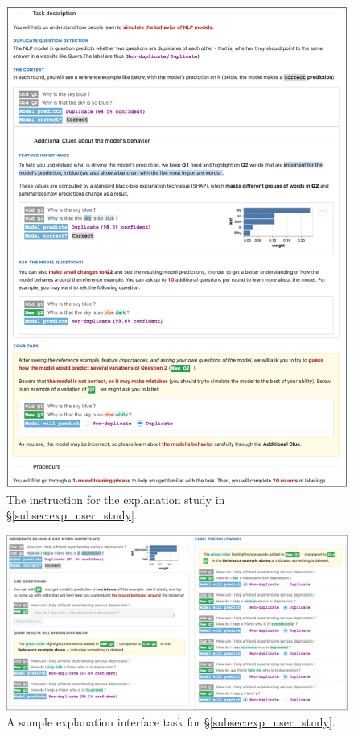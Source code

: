 \begin{figure}
\centering
\includegraphics[width=1\textwidth]{figures/explanation_instruction}
\vspace{-15pt}
\caption{The instruction for the explanation study in \S\ref{subsec:exp_user_study}.}
\vspace{-10pt}
\label{fig:explanation_instruction}
\end{figure}


\begin{figure}
\centering
\includegraphics[width=1\textwidth]{figures/explanation_task_ui}
\vspace{-15pt}
\caption{A sample explanation interface task for \S\ref{subsec:exp_user_study}.}
\vspace{-10pt}
\label{fig:explanation_ui}
\end{figure}


